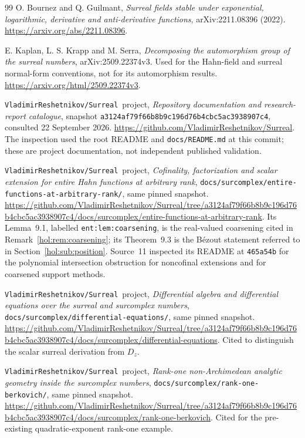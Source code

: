 \documentclass[11pt]{article}
\numberwithin{equation}{section}
\theoremstyle{definition}
\theoremstyle{remark}
\newcommand{\repo}{\texttt{VladimirReshetnikov/Surreal}}
\begin{document}
\begin{thebibliography}{99}
O. Bournez and Q. Guilmant,
\emph{Surreal fields stable under exponential, logarithmic, derivative and
anti-derivative functions},
arXiv:2211.08396 (2022).
\url{https://arxiv.org/abs/2211.08396}.

E. Kaplan, L. S. Krapp and M. Serra,
\emph{Decomposing the automorphism group of the surreal numbers},
arXiv:2509.22374v3.
Used for the Hahn-field and surreal normal-form conventions, not for its
automorphism results.
\url{https://arxiv.org/html/2509.22374v3}.

\repo\ project,
\emph{Repository documentation and research-report catalogue},
snapshot \texttt{a3124af79f66b8b9c196d76b4cbc5ac3938907c4},
consulted 22 September 2026.
\url{https://github.com/VladimirReshetnikov/Surreal}.
The inspection used the root README and \texttt{docs/README.md} at this
commit; these are project documentation, not independent published
validation.

\repo\ project,
\emph{Cofinality, factorization and scalar extension for entire Hahn functions
at arbitrary rank},
\texttt{docs/surcomplex/entire-functions-at-arbitrary-rank/}, same pinned
snapshot.
\url{https://github.com/VladimirReshetnikov/Surreal/tree/a3124af79f66b8b9c196d76b4cbc5ac3938907c4/docs/surcomplex/entire-functions-at-arbitrary-rank}.
Its Lemma~9.1, labelled \texttt{ent:lem:coarsening}, is the real-valued
coarsening cited in Remark~\ref{hol:rem:coarsening}; its Theorem~9.3 is the
B\'ezout statement referred to in Section~\ref{hol:sub:position}. Source~11
inspected its README at \texttt{465a54b} for the polynomial intersection
obstruction for noncofinal extensions and for coarsened support methods.

\repo\ project,
\emph{Differential algebra and differential equations over the surreal and
surcomplex numbers},
\texttt{docs/surcomplex/differential-equations/}, same pinned snapshot.
\url{https://github.com/VladimirReshetnikov/Surreal/tree/a3124af79f66b8b9c196d76b4cbc5ac3938907c4/docs/surcomplex/differential-equations}.
Cited to distinguish the scalar surreal derivation from $D_z$.

\repo\ project,
\emph{Rank-one non-Archimedean analytic geometry inside the surcomplex
numbers},
\texttt{docs/surcomplex/rank-one-berkovich/}, same pinned snapshot.
\url{https://github.com/VladimirReshetnikov/Surreal/tree/a3124af79f66b8b9c196d76b4cbc5ac3938907c4/docs/surcomplex/rank-one-berkovich}.
Cited for the pre-existing quadratic-exponent rank-one example.


\end{thebibliography}
\end{document}
